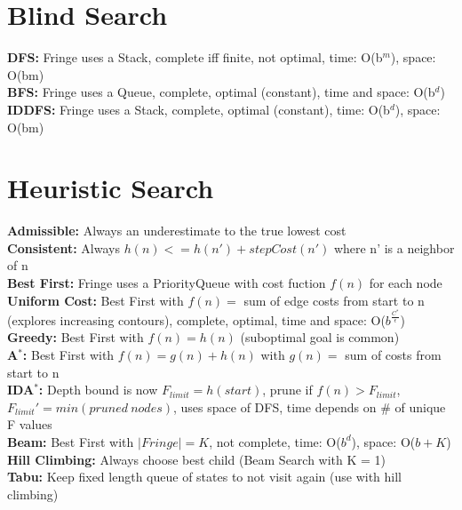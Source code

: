 \documentclass[10pt, a4paper]{article}
\begin{document}
\begin{multicols*}{1}
        \section*{Blind Search}
            \textbf{DFS:} Fringe uses a Stack, complete iff finite, not optimal, time: O(b$^{m}$), space: O(bm)\\
            \textbf{BFS:} Fringe uses a Queue, complete, optimal (constant), time and space: O(b$^{d}$)\\
            \textbf{IDDFS:} Fringe uses a Stack, complete, optimal (constant), time: O(b$^{d}$), space: O(bm)
        \section*{Heuristic Search}
            \textbf{Admissible:} Always an underestimate to the true lowest cost\\
            \textbf{Consistent:} Always $h(n) <= h(n') + stepCost(n')$ where n' is a neighbor of n\\
            \textbf{Best First:} Fringe uses a PriorityQueue with cost fuction $f(n)$ for each node\\
            \textbf{Uniform Cost:} Best First with $f(n)=$ sum of edge costs from  start to n (explores increasing contours), complete, optimal, time and space: O($b^{\frac{C^*}{\epsilon}}$)\\
            \textbf{Greedy:} Best First with $f(n)= h(n)$ (suboptimal goal is common)\\
            \textbf{A$^*$:} Best First with $f(n)= g(n) + h(n)$ with $g(n)=$ sum of costs from start to n\\
            \textbf{IDA$^*$:} Depth bound is now $F_{limit} = h(start)$, prune if $f(n) > F_{limit}$,\\ $F_{limit}' = min(pruned\ nodes)$, uses space of DFS, time depends on \# of unique F values\\
            \textbf{Beam:} Best First with $|Fringe| = K$, not complete, time: O($b^d$), space: O($b + K$)\\
            \textbf{Hill Climbing:} Always choose best child (Beam Search with K = 1)\\
            \textbf{Tabu:} Keep fixed length queue of states to not visit again (use with hill climbing)
    \end{multicols*}
\end{document}
